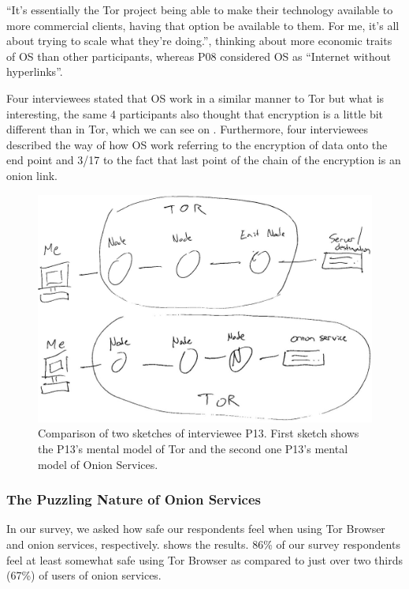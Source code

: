 “It's essentially the Tor project being able to make their technology available to more commercial clients, having that option be available to them. For me, it's all about trying to scale what they're doing.”, thinking about more economic traits of OS than other participants, whereas P08 considered OS as “Internet without hyperlinks”.

Four interviewees stated that OS work in a similar manner to Tor but what is interesting, the same 4 participants also thought that encryption is a little bit different than in Tor, which we can see on . Furthermore, four interviewees described the way of how OS work referring to the encryption of data onto the end point and 3/17 to the fact that last point of the chain of the encryption is an onion link. 


\begin{figure}[!ht]
        \centering
        \includegraphics[width=0.8\linewidth]{paper/figures/P13bothSketches.jpg}
        \caption{Comparison of two sketches of interviewee P13. First sketch shows the P13’s mental model of Tor and the second one P13’s mental model of Onion Services. }
        \label{fig:toros-sketch}
\end{figure}




\subsubsection{The Puzzling Nature of Onion Services}
In our survey, we asked how safe our
respondents feel when using Tor Browser and onion services, respectively.
 shows the results.  
86\% of our survey respondents feel at least somewhat safe using Tor Browser as compared to just over two thirds (67\%) of users of onion services.

